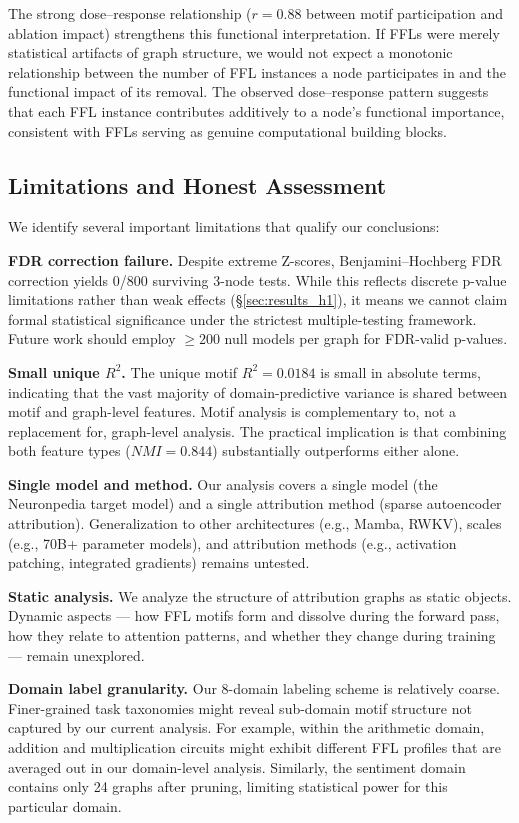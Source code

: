 The strong dose--response relationship ($r=0.88$ between motif participation and ablation impact) strengthens this functional interpretation. If FFLs were merely statistical artifacts of graph structure, we would not expect a monotonic relationship between the number of FFL instances a node participates in and the functional impact of its removal. The observed dose--response pattern suggests that each FFL instance contributes additively to a node's functional importance, consistent with FFLs serving as genuine computational building blocks.

\subsection{Limitations and Honest Assessment}
We identify several important limitations that qualify our conclusions:

\textbf{FDR correction failure.} Despite extreme Z-scores, Benjamini--Hochberg FDR correction yields 0/800 surviving 3-node tests. While this reflects discrete p-value limitations rather than weak effects (\S\ref{sec:results_h1}), it means we cannot claim formal statistical significance under the strictest multiple-testing framework. Future work should employ $\geq 200$ null models per graph for FDR-valid p-values.

\textbf{Small unique $R^2$.} The unique motif $R^2=0.0184$ is small in absolute terms, indicating that the vast majority of domain-predictive variance is shared between motif and graph-level features. Motif analysis is complementary to, not a replacement for, graph-level analysis. The practical implication is that combining both feature types ($NMI=0.844$) substantially outperforms either alone.

\textbf{Single model and method.} Our analysis covers a single model (the Neuronpedia target model) and a single attribution method (sparse autoencoder attribution). Generalization to other architectures (e.g., Mamba, RWKV), scales (e.g., 70B+ parameter models), and attribution methods (e.g., activation patching, integrated gradients) remains untested.

\textbf{Static analysis.} We analyze the structure of attribution graphs as static objects. Dynamic aspects --- how FFL motifs form and dissolve during the forward pass, how they relate to attention patterns, and whether they change during training --- remain unexplored.

\textbf{Domain label granularity.} Our 8-domain labeling scheme is relatively coarse. Finer-grained task taxonomies might reveal sub-domain motif structure not captured by our current analysis. For example, within the arithmetic domain, addition and multiplication circuits might exhibit different FFL profiles that are averaged out in our domain-level analysis. Similarly, the sentiment domain contains only 24 graphs after pruning, limiting statistical power for this particular domain.

